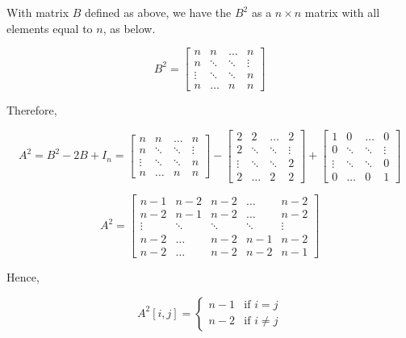 \documentclass{article}
\begin{document}
  With matrix $B$ defined as above, we have the $B^2$ as a $n\times n$ matrix with all elements equal to $n$, as below.

    \[
B^2=\begin{bmatrix}
 n&n&\hdots&n \\
  n&\ddots&\ddots&\vdots\\
   \vdots& \ddots & \ddots &n\\
  n&\hdots&n&n
  \end{bmatrix}
  \]

  Therefore,

   \[
A^2=B^2-2B+I_n=\begin{bmatrix}
 n&n&\hdots&n \\
  n&\ddots&\ddots&\vdots\\
   \vdots& \ddots & \ddots &n\\
  n&\hdots&n&n
  \end{bmatrix}
  -
  \begin{bmatrix}
 2&2&\hdots&2 \\
  2&\ddots&\ddots&\vdots\\
   \vdots& \ddots & \ddots &2\\
  2&\hdots&2&2
  \end{bmatrix}
  +
  \begin{bmatrix}
 1&0&\hdots&0 \\
  0&\ddots&\ddots&\vdots\\
   \vdots& \ddots & \ddots &0\\
  0&\hdots&0&1
  \end{bmatrix}
  \]

  \[A^2=\begin{bmatrix}
  n-1&n-2&n-2&\hdots&n-2 \\
  n-2&n-1&n-2&\hdots&n-2\\
   \vdots& \ddots & \ddots & \ddots &\vdots\\
  n-2&\hdots&n-2&n-1&n-2\\
  n-2&\hdots&n-2&n-2&n-1
  \end{bmatrix}\]

  Hence,

  \begin{equation*}
  A^2[i,j] =
    \begin{cases}
      n-1 & \text{if $i=j$}\\
      n-2 & \text{if $i\neq j$}
    \end{cases}
\end{equation*}

\end{document}
